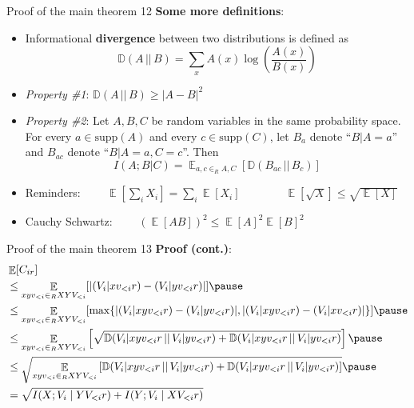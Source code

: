 \documentclass[10pt]{beamer}
\newcommand\E{\mathop{\mathbb{E}}}
\newcommand\D{\mathbb{D}}
\begin{document}
\begin{frame}{Proof of the main theorem 12}
\textbf{Some more definitions}:
\begin{itemize}
\pause
    \item Informational \textbf{divergence} between two distributions is defined as
    $$ \D(A \,||\, B) = \sum_x A(x) \log \left( \frac{A(x)}{B(x)} \right) $$
    \pause
    \item \textit{Property \#1}: $ \D(A \,||\, B) \geq |A - B|^2 $
    \vskip 0.1cm
    \pause
    \item \textit{Property \#2}: Let $A, B, C$ be random variables in the same probability space. For every $a \in \textrm{supp}(A)$ and every $c \in \textrm{supp}(C)$, let $B_a$ denote ``$B | A = a$'' and $B_{ac}$ denote ``$B|A = a, C = c$''. Then $$I(A;B|C) = \E_{a,c \in_R A,C}[\D(B_{ac} \,||\,B_c)]$$
    \vskip 0.2cm
    \pause
    \item Reminders: $\qquad \E \left[\sum_i X_i \right] = \sum_i \E[X_i] \qquad\qquad \E \left[\sqrt{X} \right] \leq \sqrt{\E[X]}$
    \vskip 0.2cm
    \item Cauchy Schwartz: $\qquad (\E[AB])^2 \leq \E[A]^2\E[B]^2$
\end{itemize}
\end{frame}

\begin{frame}{Proof of the main theorem 13}
\textbf{Proof (cont.)}:
\begin{align*}
    &\E[C_{ir}]
    \\ &\leq \E_{xyv_{<i} \in_R XYV_{<i}}[|(V_i|xv_{<i}r) - (V_i|yv_{<i}r)|] \pause
    \\ &\leq \E_{xyv_{<i} \in_R XYV_{<i}} [\max\{ |(V_i|xyv_{<i}r) - (V_i|yv_{<i}r)|, |(V_i|xyv_{<i}r) - (V_i|xv_{<i}r)| \}] \pause
    \\ &\leq \E_{xyv_{<i} \in_R XYV_{<i}} \left[ \sqrt{ \D(V_i|xyv_{<i}r \,||\, V_i|yv_{<i}r) + \D(V_i|xyv_{<i}r \,||\, V_i|yv_{<i}r)} \right] \pause
    \\ &\leq \sqrt{ \E_{xyv_{<i} \in_R XYV_{<i}} \left[ \D(V_i|xyv_{<i}r \,||\, V_i|yv_{<i}r) + \D(V_i|xyv_{<i}r \,||\, V_i|yv_{<i}r) \right] } \pause
    \\ &= \sqrt{I(X; V_i \;|\; YV_{<i}r) + I(Y; V_i \;|\; XV_{<i}r)}
\end{align*}
\end{frame}
\end{document}
